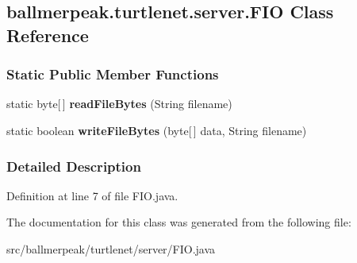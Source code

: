 \hypertarget{classballmerpeak_1_1turtlenet_1_1server_1_1FIO}{\subsection{ballmerpeak.\-turtlenet.\-server.\-F\-I\-O Class Reference}
\label{classballmerpeak_1_1turtlenet_1_1server_1_1FIO}
}
\subsubsection*{Static Public Member Functions}
\begin{DoxyCompactItemize}
\item 
\hypertarget{classballmerpeak_1_1turtlenet_1_1server_1_1FIO_ad70ad4ef8353dfa2e9485d2c36b62230}{static byte\mbox{[}$\,$\mbox{]} {\bfseries read\-File\-Bytes} (String filename)}\label{classballmerpeak_1_1turtlenet_1_1server_1_1FIO_ad70ad4ef8353dfa2e9485d2c36b62230}

\item 
\hypertarget{classballmerpeak_1_1turtlenet_1_1server_1_1FIO_a24a4c80a9dba344485887581b9067dbc}{static boolean {\bfseries write\-File\-Bytes} (byte\mbox{[}$\,$\mbox{]} data, String filename)}\label{classballmerpeak_1_1turtlenet_1_1server_1_1FIO_a24a4c80a9dba344485887581b9067dbc}

\end{DoxyCompactItemize}


\subsubsection{Detailed Description}


Definition at line 7 of file F\-I\-O.\-java.



The documentation for this class was generated from the following file\-:\begin{DoxyCompactItemize}
\item 
src/ballmerpeak/turtlenet/server/F\-I\-O.\-java\end{DoxyCompactItemize}
